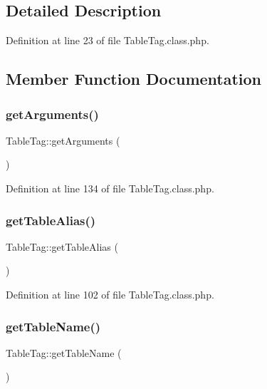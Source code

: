 \subsection{Detailed Description}


Definition at line 23 of file Table\+Tag.\+class.\+php.



\subsection{Member Function Documentation}
\mbox{\label{classTableTag_a39fa54b8c8be305fec72ce6b7e9920a3}} 
\subsubsection{\texorpdfstring{get\+Arguments()}{getArguments()}}
{\footnotesize\ttfamily Table\+Tag\+::get\+Arguments (\begin{DoxyParamCaption}{ }\end{DoxyParamCaption})}



Definition at line 134 of file Table\+Tag.\+class.\+php.

\mbox{\label{classTableTag_a52a3da2a0eee31ce88e44e38e71dfa9a}} 
\subsubsection{\texorpdfstring{get\+Table\+Alias()}{getTableAlias()}}
{\footnotesize\ttfamily Table\+Tag\+::get\+Table\+Alias (\begin{DoxyParamCaption}{ }\end{DoxyParamCaption})}



Definition at line 102 of file Table\+Tag.\+class.\+php.

\mbox{\label{classTableTag_aca16238dff09141c6de5590416c872fb}} 
\subsubsection{\texorpdfstring{get\+Table\+Name()}{getTableName()}}
{\footnotesize\ttfamily Table\+Tag\+::get\+Table\+Name (\begin{DoxyParamCaption}{ }\end{DoxyParamCaption})}




